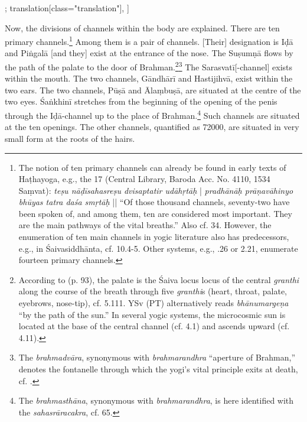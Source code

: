 \begin{alignment}[
  texts=edition[class="edition"];
  translation[class="translation"],
  ]
\begin{translation}
\begin{tlate}[p25_01]
 Now, the divisions of channels within the body are explained. There are ten primary channels.\footnote{The notion of ten primary channels can already be found in early texts of Haṭhayoga, e.g., the  17 (Central Library, Baroda Acc. No. 4110, 1534 Saṃvat): \textit{teṣu nāḍīsahasreṣu dvisaptatir udāhṛtāḥ} | \textit{pradhānāḥ prāṇavāhinyo bhūyas tatra daśa smṛtāḥ} || ``Of those thousand channels, seventy-two have been spoken of, and among them, ten are considered most important. They are the main pathways of the vital breaths.'' Also cf.  34. However, the enumeration of ten main channels in yogic literature also has predecessors, e.g., in Śaivasiddhānta, cf.  10.4-5. Other systems, e.g.,  .26 or  2.21, enumerate fourteen primary channels.} Among them is a pair of channels. [Their] designation is Iḍā and Piṅgalā [and they] exist at the entrance of the nose. The Suṣumṇā flows by the path of the palate to the door of Brahman.\footnote{According to  (p. 93), the palate is the Śaiva locus locus of the central \textit{granthi} along the course of the breath through five \textit{granthi}s (heart, throat, palate, eyebrows, nose-tip), cf.  5.111. YSv (PT) alternatively reads \textit{bhānumargeṇa} ``by the path of the sun.'' In several yogic systems, the microcosmic sun is located at the base of the central channel (cf.  4.1) and ascends upward (cf.  4.11).}\fnsep\footnote{The \textit{brahmadvāra}, synonymous with \textit{brahmarandhra} ``aperture of Brahman,'' denotes the fontanelle through which the yogi’s vital principle exits at death, cf. \citeauthor[2017: 438]{rootsofyoga2017}.} The Sarasvatī[-channel] exists within the mouth. The two channels, Gāndhārī and Hastijihvā, exist within the two ears. The two channels, Pūṣā and Ālaṃbuṣā, are situated at the centre of the two eyes. Śaṅkhinī stretches from the beginning of the opening of the penis through the Iḍā-channel up to the place of Brahman.\footnote{The \textit{brahmasthāna}, synonymous with \textit{brahmarandhra}, is here identified with the \textit{sahasrāracakra}, cf.  65.}  Such channels are situated at the ten openings. The other channels, quantified as 72000, are situated in very small form at the roots of the hairs.
\end{tlate}
  \end{translation}
\end{alignment}
